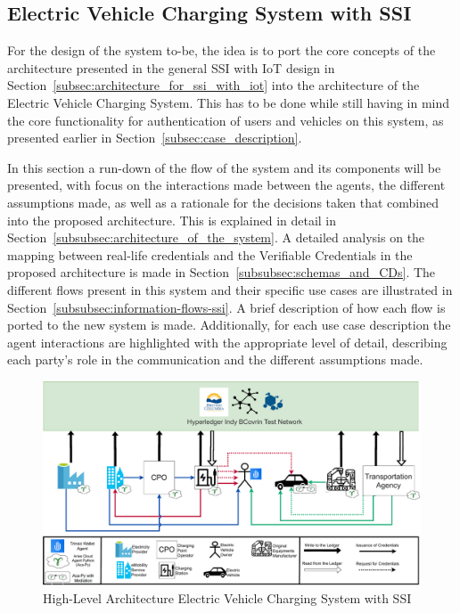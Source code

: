\newpage

\subsection{Electric Vehicle Charging System with SSI}
\label{subsec:architecture_for_electric_vehicle_charging_system_with_ssi}

For the design of the system to-be, the idea is to port the core concepts of the architecture presented in the general SSI with IoT design in Section~\ref{subsec:architecture_for_ssi_with_iot} into the architecture of the Electric Vehicle Charging System. This has to be done while still having in mind the core functionality for authentication of users and vehicles on this system, as presented earlier in Section~\ref{subsec:case_description}.

In this section a run-down of the flow of the system and its components will be presented, with focus on the interactions made between the agents, the different assumptions made, as well as a rationale for the decisions taken that combined into the proposed architecture. This is explained in detail in Section~\ref{subsubsec:architecture_of_the_system}. A detailed analysis on the mapping between real-life credentials and the Verifiable Credentials in the proposed architecture is made in Section~\ref{subsubsec:schemas_and_CDs}. The different flows present in this system and their specific use cases are illustrated in Section~\ref{subsubsec:information-flows-ssi}. A brief description of how each flow is ported to the new system is made. Additionally, for each use case description the agent interactions are highlighted with the appropriate level of detail, describing each party's role in the communication and the different assumptions made.

\begin{figure}[!htb]
    \centering
    \includegraphics[width=\linewidth]{images/PaperHighLevelArchitecture.pdf}
    \caption{High-Level Architecture Electric Vehicle Charging System with SSI}
    \label{fig:High-Level_Architecture_SSI}
\end{figure}

